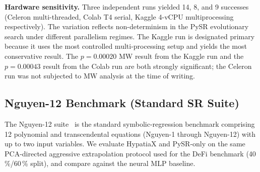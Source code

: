 \documentclass[twoside,11pt]{article}
\begin{document}
\textbf{Hardware sensitivity.}  Three independent runs yielded 14, 8, and 9
successes (Celeron multi-threaded, Colab T4 serial, Kaggle 4-vCPU multiprocessing
respectively).  The variation reflects non-determinism in the PySR evolutionary
search under different parallelism regimes.  The Kaggle run is designated primary
because it uses the most controlled multi-processing setup and yields the most
conservative result.  The $p=0.00020$ MW result from the Kaggle run and the
$p=0.00043$ result from the Colab run are both strongly significant; the Celeron
run was not subjected to MW analysis at the time of writing.

\subsection{Nguyen-12 Benchmark (Standard SR Suite)}
\label{sec:nguyen12}

The Nguyen-12 suite~\citep{uy2011semantically} is the standard symbolic-regression
benchmark comprising 12 polynomial and transcendental equations (Nguyen-1 through
Nguyen-12) with up to two input variables.  We evaluate HypatiaX and PySR-only on
the same PCA-directed aggressive extrapolation protocol used for the DeFi benchmark
(40\,\%/60\,\% split), and compare against the neural MLP baseline.
\end{document}
